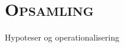 

\newpage \section{\textsc{Opsamling \label{teori_operationalisering}}}

Hypoteser og operationalisering










